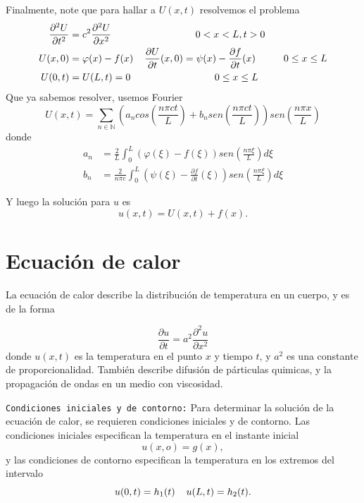\documentclass[11pt]{book}
\theoremstyle{plain}
\theoremstyle{definition}
\newcommand{\N}{\mathbb{N}}
\begin{document}
Finalmente, note que para hallar a $U(x,t)$ resolvemos el problema
\setcounter{equation}{0}
\begin{align}
    \frac{\partial^2 U}{\partial t^2} &= c^2 \frac{\partial^2 U}{\partial x^2} \hspace{30mm} 0<x<L, t > 0\\ 
    U(x,0)&= \varphi(x) - f(x) \hspace{4mm} \frac{\partial U}{\partial t}(x,0) = \psi(x) - \frac{\partial f}{\partial t}(x)  \hspace{10mm} 0\leq x\leq L\\
    U(0,t)&= U(L,t) = 0  \hspace{30mm} 0\leq x\leq L
\end{align}
Que ya sabemos resolver, usemos Fourier
\[
    U(x,t) = \sum_{n\in\N} \left(a_{n}cos\left(\frac{n\pi ct}{L}\right) + b_{n}sen\left(\frac{n\pi ct}{L}\right)\right)sen(\frac{n\pi x}{L})
\]
donde 
\begin{align*}
    a_{n} &= \frac{2}{L}\int_{0}^{L} (\varphi(\xi) - f(\xi))sen(\frac{n\pi \xi}{L})d\xi\\
    b_{n} &= \frac{2}{n\pi c}\int_{0}^{L} (\psi(\xi) - \frac{\partial f}{\partial t}(\xi))sen(\frac{n\pi \xi}{L})d\xi
\end{align*}

Y luego la solución para $u$ es
\[
u(x,t) = U(x,t) + f(x)
.\]

\chapter{Ecuación de calor}
\minitoc
La ecuación de calor describe la distribución de temperatura en un cuerpo, y es de la forma

\begin{equation}
    \frac{\partial u}{\partial t} = a^{2} \frac{\partial^2 u}{\partial x^2}
\end{equation}
donde $u(x,t)$ es la temperatura en el punto $x$ y tiempo $t$, y $a^{2}$ es una constante de proporcionalidad. También describe difusión de párticulas quimicas, y la propagación de ondas en un medio con viscosidad.

\texttt{Condiciones iniciales y de contorno:} Para determinar la solución de la ecuación de calor, se requieren condiciones iniciales y de contorno. Las condiciones iniciales especifican la temperatura en el instante inicial
$$u(x,o) = g(x),$$
y las condiciones de contorno especifican la temperatura en los extremos del intervalo 
$$u(0,t) = h_{1}(t) \hspace{4mm} u(L,t) = h_{2}(t).$$
\end{document}
